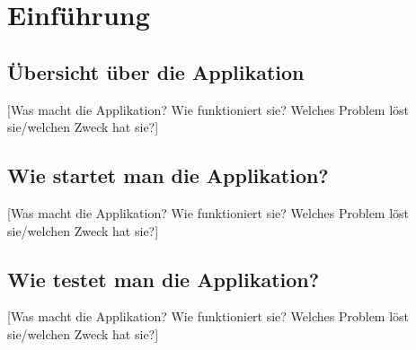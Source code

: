 \chapter{Einführung}

\section{Übersicht über die Applikation}
[Was macht die Applikation? Wie funktioniert sie? Welches Problem löst sie/welchen Zweck hat sie?]

\section{Wie startet man die Applikation?}
[Was macht die Applikation? Wie funktioniert sie? Welches Problem löst sie/welchen Zweck hat sie?]

\section{Wie testet man die Applikation?}
[Was macht die Applikation? Wie funktioniert sie? Welches Problem löst sie/welchen Zweck hat sie?]
